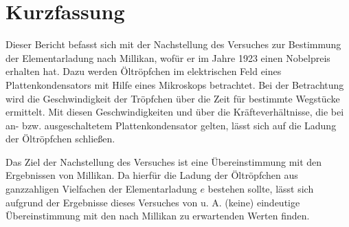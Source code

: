 
\section{Kurzfassung}

Dieser Bericht befasst sich mit der Nachstellung des Versuches zur Bestimmung der Elementarladung nach Millikan, wofür er im Jahre 1923 einen Nobelpreis erhalten hat.
Dazu werden Öltröpfchen im elektrischen Feld eines Plattenkondensators mit Hilfe eines Mikroskops betrachtet.
Bei der Betrachtung wird die Geschwindigkeit der Tröpfchen über die Zeit für bestimmte Wegstücke ermittelt. 
Mit diesen Geschwindigkeiten und über die Kräfteverhältnisse, die bei an- bzw. ausgeschaltetem Plattenkondensator gelten, lässt sich auf die Ladung der Öltröpfchen schließen.

Das Ziel der Nachstellung des Versuches ist eine Übereinstimmung mit den Ergebnissen von Millikan.
Da hierfür die Ladung der Öltröpfchen aus ganzzahligen Vielfachen der Elementarladung $e$ bestehen sollte, lässt sich aufgrund der Ergebnisse dieses Versuches von u. A. %
	(keine) eindeutige Übereinstimmung mit den nach Millikan zu erwartenden Werten finden.